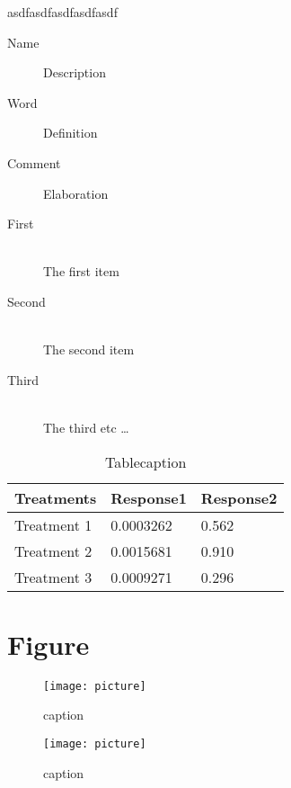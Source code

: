 \begin{corollary}
asdfasdfasdfasdfasdf
\end{corollary}

\begin{description}
\item[Name] Description
\item[Word] Definition
\item[Comment] Elaboration
\end{description}


\begin{description}
  \item[First] \hfill \\
  The first item
  \item[Second] \hfill \\
  The second item
  \item[Third] \hfill \\
  The third etc \ldots
\end{description}


\begin{table}[htp]
\centering
\begin{tabular}{l l l}
\toprule
\textbf{Treatments} & \textbf{Response1} & \textbf{Response2}\\
\midrule
Treatment 1 & 0.0003262 & 0.562 \\
Treatment 2 & 0.0015681 & 0.910 \\
Treatment 3 & 0.0009271 & 0.296 \\
\bottomrule
\end{tabular}
\caption{Tablecaption}
\end{table}


\section{Figure}

\begin{figure}[htp]
\centering
\texttt{[image: picture]}
\caption{caption}
\end{figure}

\begin{figure}[htp]
\centering
\texttt{[image: picture]}
\caption{caption}
\end{figure}



\vspace{\baselineskip}

